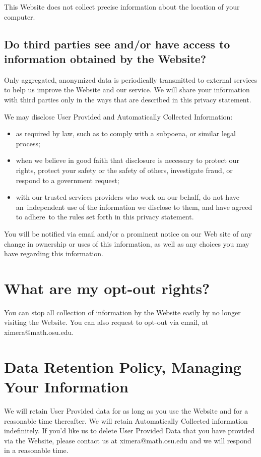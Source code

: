 \documentclass{ximera}
\begin{document}
This Website does not collect precise information about the location
of your computer.

\subsection{Do third parties see and/or have access to information
  obtained by the Website?}

Only aggregated, anonymized data is periodically transmitted to
external services to help us improve the Website and our service. We
will share your information with third parties only in the ways that
are described in this privacy statement.

We may disclose User Provided and Automatically Collected Information:
\begin{itemize}
\item
  as required by law, such as to comply with a subpoena, or similar
  legal process;
\item
  when we believe in good faith that disclosure is necessary to protect
  our rights, protect your safety or the safety of others, investigate
  fraud, or respond to a government request;
\item
  with our trusted services providers who work on our behalf, do not
  have an~independent use of the information we disclose to them, and
  have agreed to adhere~to the rules set forth in this privacy
  statement.
\end{itemize}

You will be notified via email and/or a prominent notice on our Web
site of any change in ownership or uses of this information, as well
as any choices you may have regarding this information.

\section{What are my opt-out rights?}

You can stop all collection of information by the Website easily by no
longer visiting the Website.  You can also request to opt-out via
email, at ximera@math.osu.edu.

\section{Data Retention Policy, Managing Your Information}

We will retain User Provided data for as long as you use the Website
and for a reasonable time thereafter. We will retain Automatically
Collected information indefinitely. If you'd like us to delete User
Provided Data that you have provided via the Website, please contact
us at ximera@math.osu.edu and we will respond in a reasonable time.
\end{document}

